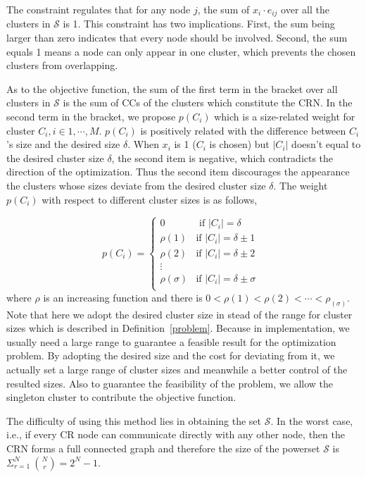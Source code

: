\documentclass[times]{ettauth}
\newcommand{\ie}{i.e., }
\theoremstyle{mytheoremstyle}
\theoremstyle{mytheoremstyle}
\theoremstyle{mytheoremstyle}
\begin{document}
The constraint regulates that for any node $j$, the sum of $x_i\cdot e_{ij}$ over all the clusters in $\mathcal{S}$ is 1.
This constraint has two implications.
First, the sum being larger than zero indicates that every node should be involved.
Second, the sum equals 1 means a node can only appear in one cluster, which prevents the chosen clusters from overlapping.

As to the objective function, the sum of the first term in the bracket over all clusters in $\mathcal{S}$ is the sum of CCs of the clusters which constitute the CRN.
In the second term in the bracket, we propose $p(C_i)$ which is a size-related weight for cluster $C_i, i\in{1,\cdots, M}$.
$p(C_i)$ is positively related with the difference between $C_i$'s size and the desired size $\delta$.
When $x_i$ is 1 ($C_i$ is chosen) but $|C_i|$ doesn't equal to the desired cluster size $\delta$, the second item is negative, which contradicts the direction of the optimization.
Thus the second item discourages the appearance the clusters whose sizes deviate from the desired cluster size $\delta$.
The weight $p(C_i)$ with respect to different cluster sizes is as follows,

$$
p(C_i) = \left\{ \begin{array}{rl}
0 &\mbox{ if $|C_i|=\delta$} \\
\rho(1) &\mbox{if $|C_i|=\delta \pm 1$ } \\
\rho(2) &\mbox{if $|C_i|=\delta \pm 2$} \\
\vdots\\
\rho(\sigma) &\mbox{if $|C_i|=\delta \pm \sigma$} \\
\end{array} \right.
$$
where $\rho$ is an increasing function and there is $ 0 < \rho(1)< \rho(2) < \cdots < \rho_(\sigma)$.
Note that here we adopt the desired cluster size in stead of the range for cluster sizes which is described in Definition~\ref{problem}.
Because in implementation, we usually need a large range to guarantee a feasible result for the optimization problem.
By adopting the desired size and the cost for deviating from it, we actually set a large range of cluster sizes and meanwhile a better control of the resulted sizes. 
Also to guarantee the feasibility of the problem, we allow the singleton cluster to contribute the objective function.


The difficulty of using this method lies in obtaining the set $\mathcal{S}$.
In the worst case, \ie if every CR node can communicate directly with any other node, then the CRN forms a full connected graph and therefore the size of the powerset $\mathcal{S}$ is $\Sigma_{r=1}^{N}\ {N \choose r} = 2^N-1$.
\end{document}
